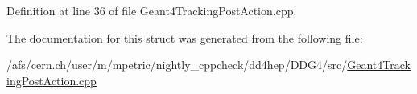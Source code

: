 Definition at line 36 of file Geant4\+Tracking\+Post\+Action.\+cpp.



The documentation for this struct was generated from the following file\+:\begin{DoxyCompactItemize}
\item 
/afs/cern.\+ch/user/m/mpetric/nightly\+\_\+cppcheck/dd4hep/\+D\+D\+G4/src/\hyperlink{_geant4_tracking_post_action_8cpp}{Geant4\+Tracking\+Post\+Action.\+cpp}\end{DoxyCompactItemize}
